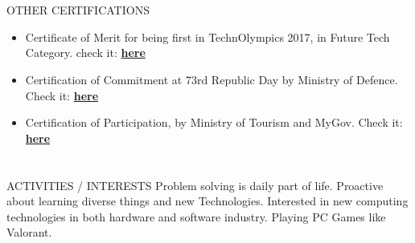\documentclass{my_cv}
\begin{document}
\begin{multicols}{2}
\section{\faStar}{OTHER CERTIFICATIONS}

\begin{itemize}[noitemsep]
    \item Certificate of Merit for being first in TechnOlympics 2017, in Future Tech Category.
    check it: \textbf{\href{https://drive.google.com/file/d/1RLxo1emzGHALReSLDn7UjfB2_2hTYwOW/view}{here}}
    \item Certification of Commitment at 73rd Republic Day by Ministry of Defence. Check it: \textbf{\href{https://drive.google.com/file/d/19l8o8HjbIlwEPfwosTMTENgxJ1geFbsB/view?usp=sharing}{here}}
    \item Certification of Participation, by Ministry of Tourism and MyGov. Check it: \textbf{\href{https://drive.google.com/file/d/10gOOfH7SBqizZOaP-F6VMnyDdtaQRh1v/view?usp=sharing}{here}}
\end{itemize}

\section{\faSoccerBallO}{ACTIVITIES / INTERESTS}
Problem solving is daily part of life.
Proactive about learning diverse things and new Technologies.
Interested in new computing technologies in both hardware and software industry.
Playing PC Games like Valorant.
\end{multicols}
\end{document}
